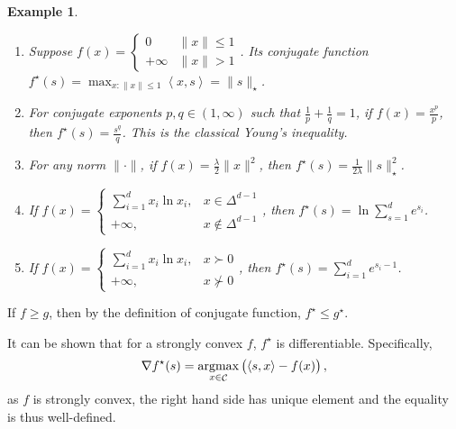 \documentclass{article}
\newtheorem{example}{Example}
\DeclareMathOperator*{\Ccal}{{\cal C}}
\DeclareMathOperator*{\argmax}{{\rm argmax}}
\newcommand{\inner}[2]{\left\langle #1,#2 \right\rangle}
\begin{document}
\begin{example}
\begin{enumerate}
  \item Suppose $f(x) = \begin{cases} 0 & \| x \| \leq 1 \\ +\infty & \| x \| > 1 \end{cases}$. Its conjugate function $f^\star(s) = \max_{x: \| x \| \leq 1} \inner{x}{s} = \| s \|_\star$.

  \item For conjugate exponents $p, q \in (1,\infty)$ such that $\frac1p + \frac1q = 1$, if $f(x) = \frac{x^{p}}{p}$, then $f^\star(s) = \frac{s^q}{q}$. This is the classical Young's inequality.
  \item For any norm $\| \cdot \|$, if $f(x) = \frac\lambda2 \| x \|^2$, then $f^\star(s) = \frac1{2\lambda}\| s \|_\star^2$.
  \item If $f(x) = \begin{cases} \sum_{i=1}^d x_i \ln x_i, & x \in \Delta^{d-1} \\
   +\infty, & x \notin \Delta^{d-1} \end{cases}$, then $f^\star(s) = \ln \sum_{s=1}^d e^{s_i}$.
  \item If $f(x) = \begin{cases} \sum_{i=1}^d x_i \ln x_i, & x \succ 0 \\
   +\infty, & x \nsucc 0 \end{cases}$, then $f^\star(s) = \sum_{i=1}^d e^{s_i - 1}$.
\end{enumerate}
\end{example}


If $f \geq g$, then by the definition of conjugate function, $f^\star \leq g^\star$.

It can be shown that for a strongly convex $f$, $f^\star$ is differentiable. Specifically,
\[ \nabla f^\star(s) = \argmax_{x \in \Ccal} \del{\inner{s}{x} - f(x)}, \]
as $f$ is strongly convex, the right hand side has unique element and the equality
is thus well-defined.
\end{document}
